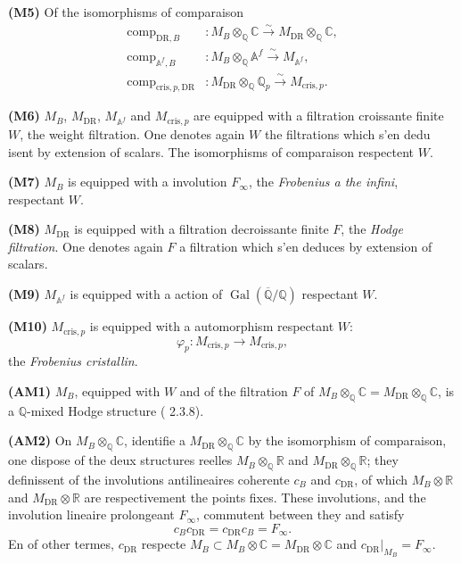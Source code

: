 \documentclass[12pt,a4paper]{article}
\theoremstyle{plain}
\theoremstyle{definition}
\theoremstyle{remark}
\DeclareMathOperator{\Gal}{Gal}
\providecommand{\Gal}{\operatorname{Gal}}
\providecommand{\DR}{\mathrm{DR}}
\providecommand{\cris}{\mathrm{cris}}
\providecommand{\comp}{\operatorname{comp}}
\begin{document}
\textbf{(M5)} Of the isomorphisms of comparaison
\begin{align*}
\comp_{\DR,B} &: M_B \otimes_{\mathbb{Q}} \mathbb{C} \xrightarrow{\sim} M_{\DR} \otimes_{\mathbb{Q}} \mathbb{C}, \\
\comp_{\mathbb{A}^f,B} &: M_B \otimes_{\mathbb{Q}} \mathbb{A}^f \xrightarrow{\sim} M_{\mathbb{A}^f}, \\
\comp_{\cris,p,\DR} &: M_{\DR} \otimes_{\mathbb{Q}} \mathbb{Q}_p \xrightarrow{\sim} M_{\cris,p}.
\end{align*}

\textbf{(M6)} $M_B$, $M_{\DR}$, $M_{\mathbb{A}^f}$ and $M_{\cris,p}$ are equipped with a filtration
croissante finite $W$, the weight filtration. One denotes again $W$ the filtrations which
s'en dedu isent by extension of scalars. The isomorphisms of comparaison respectent $W$.

\textbf{(M7)} $M_B$ is equipped with a involution $F_\infty$, the \emph{Frobenius a the infini},
respectant $W$.

\textbf{(M8)} $M_{\DR}$ is equipped with a filtration decroissante finite $F$, the \emph{Hodge filtration}. One denotes again $F$ a filtration which s'en deduces by extension of scalars.

\textbf{(M9)} $M_{\mathbb{A}^f}$ is equipped with a action of $\Gal(\overline{\mathbb{Q}}/\mathbb{Q})$
respectant $W$.

\textbf{(M10)} $M_{\cris,p}$ is equipped with a automorphism respectant $W$:
\[
\varphi_p: M_{\cris,p} \longrightarrow M_{\cris,p},
\]
the \emph{Frobenius cristallin}.

\textbf{(AM1)} $M_B$, equipped with $W$ and of the filtration $F$ of
$M_B \otimes_{\mathbb{Q}} \mathbb{C} = M_{\DR} \otimes_{\mathbb{Q}} \mathbb{C}$, is a
$\mathbb{Q}$-mixed Hodge structure (\cite{D2} 2.3.8).

\textbf{(AM2)} On $M_B \otimes_{\mathbb{Q}} \mathbb{C}$, identifie a
$M_{\DR} \otimes_{\mathbb{Q}} \mathbb{C}$ by the isomorphism of comparaison, one dispose of the
deux structures reelles $M_B \otimes_{\mathbb{Q}} \mathbb{R}$ and
$M_{\DR} \otimes_{\mathbb{Q}} \mathbb{R}$; they definissent of the involutions antilineaires
coherente $c_B$ and $c_{\DR}$, of which $M_B \otimes \mathbb{R}$ and $M_{\DR} \otimes \mathbb{R}$
 are respectivement the points fixes. These involutions, and the involution lineaire
prolongeant $F_\infty$, commutent between they and satisfy
\[
c_B c_{\DR} = c_{\DR} c_B = F_\infty.
\]
En of other termes, $c_{\DR}$ respecte $M_B \subset M_B \otimes \mathbb{C} =
M_{\DR} \otimes \mathbb{C}$ and $c_{\DR}|_{M_B} = F_\infty$.
\end{document}
